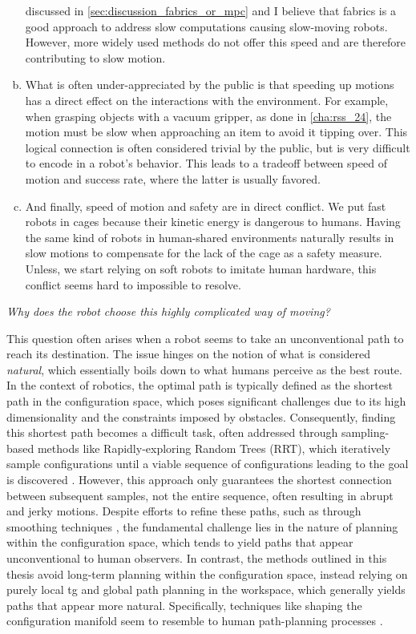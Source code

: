 \begin{enumerate}[(a)]
    discussed in \cref{sec:discussion_fabrics_or_mpc} and I
    believe that \ac{fabrics} is a good approach to
    address slow computations causing slow-moving robots.
    However, more widely used methods do not offer this
    speed and are therefore contributing to slow motion.
  \item What is often under-appreciated by the public is
    that speeding up motions has a direct effect on the
    interactions with the environment. For example, when
    grasping objects with a vacuum gripper, as done in 
    \cref{cha:rss_24}, the motion must be slow when
    approaching an item to avoid it tipping over. This
    logical connection is often considered trivial by the
    public, but is very difficult to encode in a robot's
    behavior. This leads to a tradeoff between speed of
    motion and success rate, where the latter is usually
    favored.
  \item And finally, speed of motion and safety are in direct
    conflict. We put fast robots in cages because their
    kinetic energy is dangerous to humans. Having the same
    kind of robots in human-shared environments naturally 
    results in slow motions to compensate for the lack of
    the cage as a safety measure. Unless, we start relying
    on soft robots to imitate human hardware, this conflict
    seems hard to impossible to resolve.
\end{enumerate}

\textit{Why does the robot choose this highly complicated
way of moving?}

This question often arises when a robot seems to take an
unconventional path to reach its destination. The issue
hinges on the notion of what is considered \textit{natural},
which essentially boils down to what humans perceive as the
best route. In the context of robotics, the optimal
path is typically defined as the shortest path in the
configuration space, which poses significant challenges due
to its high dimensionality and the constraints imposed by
obstacles. Consequently, finding this shortest path becomes
a difficult task, often addressed through sampling-based
methods like Rapidly-exploring Random Trees (RRT), which
iteratively sample configurations until a viable sequence of
configurations leading to the goal is discovered
\cite{Karaman2011}. However, this approach only guarantees
the shortest connection between subsequent samples, not the
entire sequence, often resulting in abrupt and jerky
motions. Despite efforts to refine these paths, such as
through smoothing techniques
\cite{siegwart2011introduction}, the fundamental challenge
lies in the nature of planning within the configuration
space, which tends to yield paths that appear unconventional
to human observers. In contrast, the methods outlined in
this thesis avoid long-term planning within the
configuration space, instead relying on purely local \ac{tg}
and global path planning in the workspace, which generally
yields paths that appear more natural. Specifically,
techniques like shaping the configuration manifold seem to
resemble to human path-planning processes
\cite{klein2022riemannian}.


